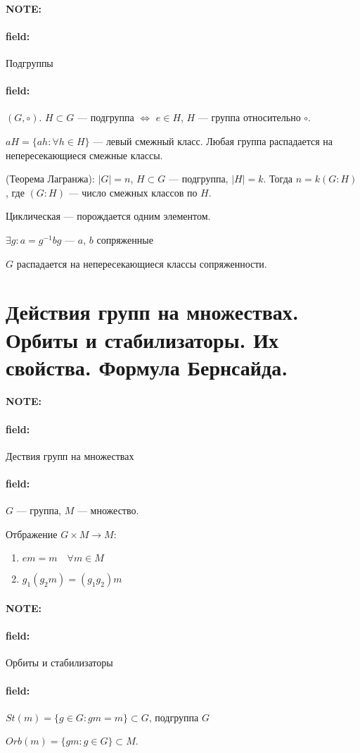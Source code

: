\documentclass[12pt]{article}
\newenvironment{note}{\paragraph{NOTE:}}{}
\newenvironment{field}{\paragraph{field:}}{}
\begin{document}
\begin{note}
  \begin{field}
    Подгруппы
  \end{field}

  \begin{field}
    $(G, \circ)$. $H \subset G$ --- подгруппа $\Leftrightarrow$ $e \in H$, $H$ --- группа относительно $\circ$.

    $aH = \{ah : \forall h \in H\}$ --- левый смежный класс. Любая группа распадается на непересекающиеся смежные классы.
  \end{field}

  (Теорема Лагранжа): $|G| = n$, $H \subset G$ --- подгруппа, $|H| = k$. Тогда
  $n = k(G : H)$, где $(G : H)$ --- число смежных классов по $H$.

  Циклическая --- порождается одним элементом.

  $\exists g : a = g^{-1}bg$ --- $a$, $b$ сопряженные

  $G$ распадается на непересекающиеся классы сопряженности.
\end{note}

\section{Действия групп на множествах. Орбиты и стабилизаторы. Их свойства.
Формула Бернсайда.}

\begin{note}
  \begin{field}
    Дествия групп на множествах
  \end{field}
  \begin{field}
    $G$ --- группа, $M$ --- множество.

    Отбражение $G \times M \rightarrow M$:
    \begin{enumerate}
      \item
      $em = m \quad{} \forall m \in M$
      \item
      $g_{1}(g_{2}m) = (g_{1}g_{2})m$
    \end{enumerate}
  \end{field}
\end{note}

\begin{note}
  \begin{field}
    Орбиты и стабилизаторы
  \end{field}
  \begin{field}
    $St(m) = \{g \in G : gm = m\} \subset G$, подгруппа $G$

    $Orb(m) = \{gm : g \in G\} \subset M$.
  \end{field}
\end{note}
\end{document}
